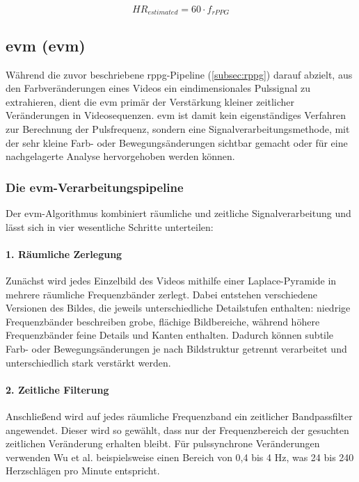 \begin{equation}
HR_{estimated} = 60 \cdot f_{rPPG}
\end{equation}

\subsection{\acl{evm} (\acs{evm})}
\label{subsec:evm}

Während die zuvor beschriebene \ac{rppg}-Pipeline (\cref{subsec:rppg}) darauf abzielt, aus den Farbveränderungen eines Videos ein eindimensionales Pulssignal zu extrahieren, dient die \ac{evm} primär der Verstärkung kleiner zeitlicher Veränderungen in Videosequenzen. \ac{evm} ist damit kein eigenständiges Verfahren zur Berechnung der Pulsfrequenz, sondern eine Signalverarbeitungsmethode, mit der sehr kleine Farb- oder Bewegungsänderungen sichtbar gemacht oder für eine nachgelagerte Analyse hervorgehoben werden können.

\subsubsection{Die \acs{evm}-Verarbeitungspipeline}

Der \ac{evm}-Algorithmus kombiniert räumliche und zeitliche Signalverarbeitung und lässt sich in vier wesentliche Schritte unterteilen:

\paragraph{1. Räumliche Zerlegung} 
Zunächst wird jedes Einzelbild des Videos mithilfe einer Laplace-Pyramide in mehrere räumliche Frequenzbänder zerlegt. Dabei entstehen verschiedene Versionen des Bildes, die jeweils unterschiedliche Detailstufen enthalten: niedrige Frequenzbänder beschreiben grobe, flächige Bildbereiche, während höhere Frequenzbänder feine Details und Kanten enthalten. Dadurch können subtile Farb- oder Bewegungsänderungen je nach Bildstruktur getrennt verarbeitet und unterschiedlich stark verstärkt werden.

\paragraph{2. Zeitliche Filterung} 
Anschließend wird auf jedes räumliche Frequenzband ein zeitlicher Bandpassfilter angewendet. Dieser wird so gewählt, dass nur der Frequenzbereich der gesuchten zeitlichen Veränderung erhalten bleibt. Für pulssynchrone Veränderungen verwenden Wu et al. beispielsweise einen Bereich von 0,4 bis 4 Hz, was 24 bis 240 Herzschlägen pro Minute entspricht.

